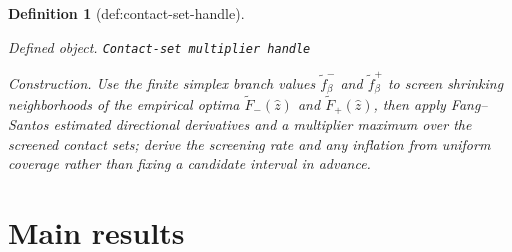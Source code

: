 \documentclass{article}
\newtheorem{definition}{Definition}
\begin{document}
\begin{definition}[def:contact-set-handle]\label{def:contact-set-handle}
\par\smallskip\noindent\emph{Defined object.} \texttt{Contact-\allowbreak{}set multiplier handle}
\par\smallskip\noindent\emph{Construction.} Use the finite simplex branch values \(\widetilde f_\beta^-\) and \(\widetilde f_\beta^+\) to screen shrinking neighborhoods of the empirical optima \(\widetilde F_-(\widehat z)\) and \(\widetilde F_+(\widehat z)\), then apply Fang--Santos estimated directional derivatives and a multiplier maximum over the screened contact sets; derive the screening rate and any inflation from uniform coverage rather than fixing a candidate interval in advance.
\end{definition}

\section{Main results}
\end{document}
